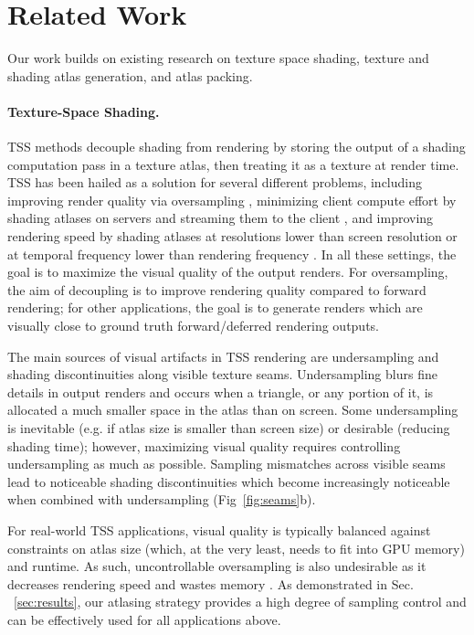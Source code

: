 \section{Related Work}
\label{sec:related}

Our work builds on existing research on texture space shading, texture and shading atlas generation, and atlas packing. 

\paragraph*{Texture-Space Shading.} 
TSS methods decouple shading from rendering by storing the output of a shading computation pass in a texture atlas, then treating it as a texture at render time. TSS has been hailed as a solution for several different problems, including improving render quality via oversampling \cite{Baker2022,baker:2016}, minimizing client compute effort by shading atlases on servers and streaming them to the client \cite{mueller2018shading,hladky2019tessellated,hladky2021snakebinning,Neff2022MSA}, and improving rendering speed by shading atlases at resolutions lower than screen resolution or at temporal frequency lower than rendering frequency \cite{mueller2021tasa}. In all these settings, the goal is to maximize the visual quality of the output renders. For oversampling, the aim of decoupling is to improve rendering quality compared to forward rendering; for other applications, the goal is to generate renders which are visually close to ground truth forward/deferred rendering outputs.

The main sources of visual artifacts in TSS rendering are undersampling and shading discontinuities along visible texture seams. Undersampling blurs fine details in output renders and occurs when a triangle, or any portion of it, is allocated a much smaller space in the atlas than on screen. Some undersampling is inevitable (e.g. if atlas size is smaller than screen size) or desirable (reducing shading time); however, maximizing visual quality requires controlling undersampling as much as possible. Sampling mismatches across visible seams lead to noticeable shading discontinuities \cite{liu2017seamless} which become increasingly noticeable when combined with undersampling (Fig~\ref{fig:seams}b). 

For real-world TSS applications, visual quality is typically balanced against constraints on atlas size (which, at the very least, needs to fit into GPU memory) and runtime. 
As such, uncontrollable oversampling is also undesirable as it decreases rendering speed and wastes memory \cite{hillesland2016texel}.
As demonstrated in Sec. ~\ref{sec:results}, our atlasing strategy provides a high degree of sampling control and can be effectively used for all applications above.

